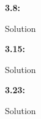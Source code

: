 \begin{homeworkProblem}

	\textbf{3.8:}

	\solution

	Solution

\end{homeworkProblem}

\begin{homeworkProblem}

	\textbf{3.15:}

	\solution

	Solution

\end{homeworkProblem}

\begin{homeworkProblem}

	\textbf{3.23:}

	\solution

	Solution

\end{homeworkProblem}


